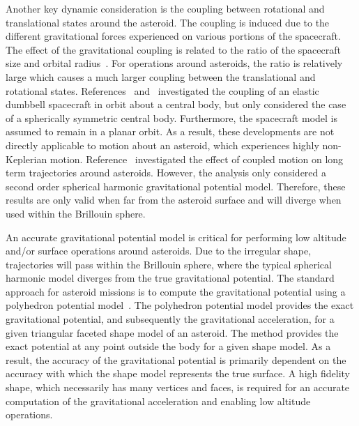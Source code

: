 Another key dynamic consideration is the coupling between rotational and translational states around the asteroid.
The coupling is induced due to the different gravitational forces experienced on various portions of the spacecraft. 
The effect of the gravitational coupling is related to the ratio of the spacecraft size and orbital radius~\cite{hughes2004}.
For operations around asteroids, the ratio is relatively large which causes a much larger coupling between the translational and rotational states.
References~\textcite{elmasri2005} and~\textcite{sanyal2004a} investigated the coupling of an elastic dumbbell spacecraft in orbit about a central body, but only considered the case of a spherically symmetric central body.
Furthermore, the spacecraft model is assumed to remain in a planar orbit.
As a result, these developments are not directly applicable to motion about an asteroid, which experiences highly non-Keplerian motion.
Reference~\textcite{misra2015b} investigated the effect of coupled motion on long term trajectories around asteroids.
However, the analysis only considered a second order spherical harmonic gravitational potential model. 
Therefore, these results are only valid when far from the asteroid surface and will diverge when used within the Brillouin sphere.

An accurate gravitational potential model is critical for performing low altitude and/or surface operations around asteroids.
Due to the irregular shape, trajectories will pass within the Brillouin sphere, where the typical spherical harmonic model diverges from the true gravitational potential.
The standard approach for asteroid missions is to compute the gravitational potential using a polyhedron potential model~\cite{werner1996}.
The polyhedron potential model provides the exact gravitational potential, and subsequently the gravitational acceleration, for a given triangular faceted shape model of an asteroid.
The method provides the exact potential at any point outside the body for a given shape model.
As a result, the accuracy of the gravitational potential is primarily dependent on the accuracy with which the shape model represents the true surface.
A high fidelity shape, which necessarily has many vertices and faces, is required for an accurate computation of the gravitational acceleration and enabling low altitude operations.

